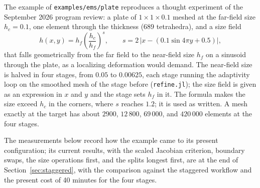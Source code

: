 \documentclass[11pt]{article}
\newcommand{\code}[1]{\texttt{#1}}
\begin{document}
The example of \code{examples/ems/plate} reproduces a thought experiment
of the September 2026 program review: a plate of $1 \times 1 \times 0.1$
meshed at the far-field size $h_c = 0.1$, one element through the
thickness (689 tetrahedra), and a size field
\begin{equation}
h(x, y) = h_f \left(\frac{h_c}{h_f}\right)^{s},
\qquad
s = 2\,\lvert x - (0.1 \sin 4\pi y + 0.5)\rvert,
\end{equation}
that falls geometrically from the far field to the near-field size
$h_f$ on a sinusoid through the plate, as a localizing deformation
would demand. The near-field size is halved in four stages, from $0.05$
to $0.00625$, each stage running the adaptivity loop on the smoothed
mesh of the stage before (\code{refine.jl}); the size field is given as
an expression in $x$ and $y$ and the stage sets $h_f$ in it. The
formula makes the size exceed $h_c$ in the corners, where $s$ reaches
$1.2$; it is used as written. A mesh exactly at the target has about
$2900$, $12\,800$, $69\,000$, and $420\,000$ elements at the four
stages.

The measurements below record how the example came to its present
configuration; its current results, with the scaled Jacobian criterion,
boundary swaps, the size operations first, and the splits longest first,
are at the end of Section~\ref{sec:staggered}, with the comparison
against the staggered workflow and the present cost of 40 minutes for
the four stages.
\end{document}
